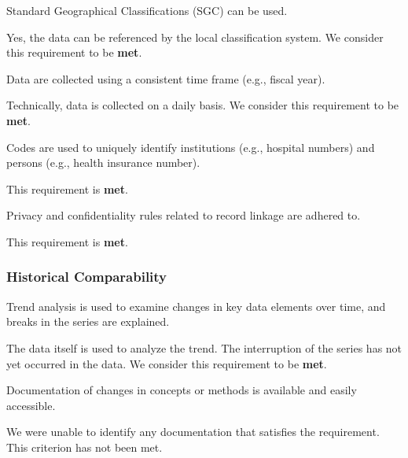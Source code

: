 \begin{QandA}
    \item Standard Geographical Classifications (SGC) can be used.
    \begin{answered}
        Yes, the data can be referenced by the local classification system.
        We consider this requirement to be \textbf{met}.
    \end{answered}

    \item Data are collected using a consistent time frame (e.g., fiscal year).
    \begin{answered}
        Technically, data is collected on a daily basis.
        We consider this requirement to be \textbf{met}.
    \end{answered}

    \item Codes are used to uniquely identify institutions (e.g., hospital numbers) and persons (e.g., health insurance number).
    \begin{answered}
        This requirement is \textbf{met}.
    \end{answered}

    \item Privacy and confidentiality rules related to record linkage are adhered to.
    \begin{answered}
        This requirement is \textbf{met}.
    \end{answered}

\end{QandA}

\subsubsection{Historical Comparability}

\begin{QandA}
    \item Trend analysis is used to examine changes in key data elements over time, and breaks in the series are explained.
    \begin{answered}
        The data itself is used to analyze the trend.
        The interruption of the series has not yet occurred in the data.
        We consider this requirement to be \textbf{met}.
    \end{answered}

    \item Documentation of changes in concepts or methods is available and easily accessible.
    \begin{answered}
        We were unable to identify any documentation that satisfies the requirement.
        This criterion has not been met.
    \end{answered}

\end{QandA}

